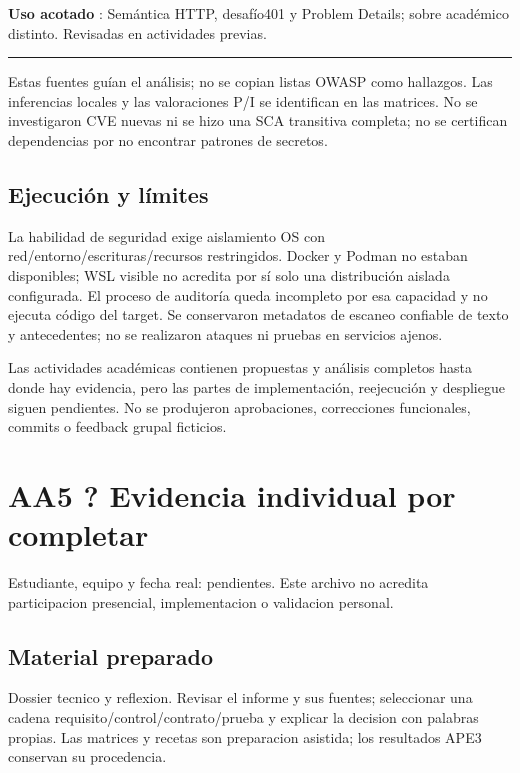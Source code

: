 \documentclass[12pt,a4paper]{report}
\begin{document}
\textbf{Uso acotado }: Semántica HTTP, desafío401 y Problem Details;
sobre académico distinto. Revisadas en actividades previas.

\medskip\hrule\medskip

Estas fuentes guían el análisis; no se copian listas OWASP como
hallazgos. Las inferencias locales y las valoraciones P/I se identifican
en las matrices. No se investigaron CVE nuevas ni se hizo una SCA
transitiva completa; no se certifican dependencias por no encontrar
patrones de secretos.

\section{Ejecución y
límites}\label{AA5-semana-5-anexo2-ejecuciuxf3n-y-luxedmites}

La habilidad de seguridad exige aislamiento OS con
red/entorno/escrituras/recursos restringidos. Docker y Podman no estaban
disponibles; WSL visible no acredita por sí solo una distribución
aislada configurada. El proceso de auditoría queda incompleto por esa
capacidad y no ejecuta código del target. Se conservaron metadatos de
escaneo confiable de texto y antecedentes; no se realizaron ataques ni
pruebas en servicios ajenos.

Las actividades académicas contienen propuestas y análisis completos
hasta donde hay evidencia, pero las partes de implementación,
reejecución y despliegue siguen pendientes. No se produjeron
aprobaciones, correcciones funcionales, commits o feedback grupal
ficticios.
\chapter{AA5 ? Evidencia individual por
completar}\label{AA5-semana-5-anexo3-aa5--evidencia-individual-por-completar}

Estudiante, equipo y fecha real: pendientes. Este archivo no acredita
participacion presencial, implementacion o validacion personal.

\section{Material
preparado}\label{AA5-semana-5-anexo3-material-preparado}

Dossier tecnico y reflexion. Revisar el informe y sus fuentes;
seleccionar una cadena requisito/control/contrato/prueba y explicar la
decision con palabras propias. Las matrices y recetas son preparacion
asistida; los resultados APE3 conservan su procedencia.
\end{document}

